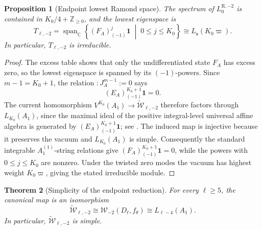 \documentclass[11pt,reqno]{amsart}
\newtheorem{theorem}{Theorem}[section]
\newtheorem{proposition}[theorem]{Proposition}
\theoremstyle{definition}
\theoremstyle{remark}
\begin{document}
\begin{proposition}[Endpoint lowest Ramond space]
\label{dl:prop:Dl-minus-two-lowest-space}
The spectrum of \(L_0^{\mathrm R,-2}\) is contained in
\(K_0/4+\mathbb Z_{\ge0}\), and the lowest eigenspace is
\begin{equation*}
  T_{\ell,-2}
  =
  \operatorname{span}_{\mathbb C}
  \left\{
    (F_A)_{(-1)}^j\mathbf1
    \;\middle|\;
    0\le j\le K_0
  \right\}
  \cong
  L_{\mathfrak s}(K_0\varpi).
\end{equation*}
In particular, \(T_{\ell,-2}\) is irreducible.
\end{proposition}

\begin{proof}
The excess table shows that only the undifferentiated state \(F_A\)
has excess zero, so the lowest eigenspace is spanned by its
\((-1)\)-powers.  Since \(m-1=K_0+1\), the relation
\(:J_A^{m-1}:=0\) says
\[
  (E_A)_{(-1)}^{K_0+1}\mathbf1=0.
\]
The current homomorphism
\(V^{K_0}(A_1)\to\widetilde{\mathcal W}_{\ell,-2}\) therefore factors
through \(L_{K_0}(A_1)\), since the maximal ideal of the positive
integral-level universal affine algebra is generated by
\((E_A)_{(-1)}^{K_0+1}\mathbf1\); see \cite{Kac1998}.  The induced map is
injective because it preserves the vacuum and \(L_{K_0}(A_1)\) is simple.
Consequently the standard integrable \(A_1^{(1)}\)-string relations give
\((F_A)_{(-1)}^{K_0+1}\mathbf1=0\), while the powers with
\(0\le j\le K_0\) are nonzero.  Under the twisted zero modes the
vacuum has highest weight \(K_0\varpi\), giving the stated
irreducible module.
\end{proof}

\begin{theorem}[Simplicity of the endpoint reduction]
\label{dl:thm:Dl-minus-two-reduced-simple}
For every \(\ell\ge5\), the canonical map is an isomorphism
\begin{equation*}
 \widetilde{\mathcal W}_{\ell,-2}
 \cong
 \mathcal W_{-2}(D_\ell,f_\theta)
 \cong
 L_{\ell-4}(A_1).
\end{equation*}
In particular, \(\widetilde{\mathcal W}_{\ell,-2}\) is simple.
\end{theorem}
\end{document}
